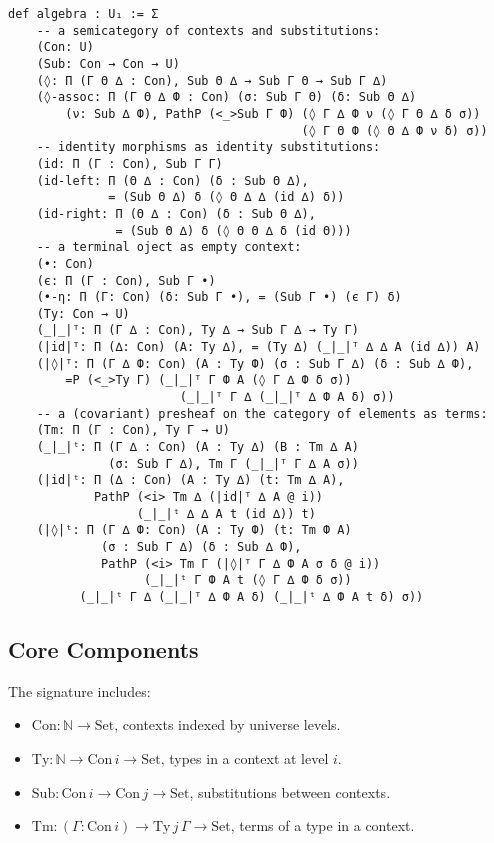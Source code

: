 \documentclass{article}
\begin{document}
\begin{lstlisting}[mathescape=true]
def algebra : U₁ := Σ
    -- a semicategory of contexts and substitutions:
    (Con: U)
    (Sub: Con → Con → U)
    (◊: Π (Г Θ ∆ : Con), Sub Θ ∆ → Sub Г Θ → Sub Г ∆)
    (◊-assoc: Π (Г Θ ∆ Ф : Con) (σ: Sub Г Θ) (δ: Sub Θ ∆)
        (ν: Sub ∆ Ф), PathP (<_>Sub Г Ф) (◊ Г ∆ Ф ν (◊ Г Θ ∆ δ σ))
                                         (◊ Г Θ Ф (◊ Θ ∆ Ф ν δ) σ))
    -- identity morphisms as identity substitutions:
    (id: Π (Г : Con), Sub Г Г)
    (id-left: Π (Θ ∆ : Con) (δ : Sub Θ ∆),
              = (Sub Θ ∆) δ (◊ Θ ∆ ∆ (id ∆) δ))
    (id-right: Π (Θ ∆ : Con) (δ : Sub Θ ∆),
               = (Sub Θ ∆) δ (◊ Θ Θ ∆ δ (id Θ)))
    -- a terminal oject as empty context:
    (•: Con)
    (є: Π (Г : Con), Sub Г •)
    (•-η: Π (Г: Con) (δ: Sub Г •), = (Sub Г •) (є Г) δ)
    (Ty: Con → U)
    (_|_|ᵀ: Π (Г ∆ : Con), Ty ∆ → Sub Г ∆ → Ty Г)
    (|id|ᵀ: Π (∆: Con) (A: Ty ∆), = (Ty ∆) (_|_|ᵀ ∆ ∆ A (id ∆)) A)
    (|◊|ᵀ: Π (Г ∆ Ф: Con) (A : Ty Ф) (σ : Sub Г ∆) (δ : Sub ∆ Ф),
        =P (<_>Ty Г) (_|_|ᵀ Г Ф A (◊ Г ∆ Ф δ σ))
                        (_|_|ᵀ Г ∆ (_|_|ᵀ ∆ Ф A δ) σ))
    -- a (covariant) presheaf on the category of elements as terms:
    (Tm: Π (Г : Con), Ty Г → U)
    (_|_|ᵗ: Π (Г ∆ : Con) (A : Ty ∆) (B : Tm ∆ A)
              (σ: Sub Г ∆), Tm Г (_|_|ᵀ Г ∆ A σ))
    (|id|ᵗ: Π (∆ : Con) (A : Ty ∆) (t: Tm ∆ A),
            PathP (<i> Tm ∆ (|id|ᵀ ∆ A @ i))
                  (_|_|ᵗ ∆ ∆ A t (id ∆)) t)
    (|◊|ᵗ: Π (Г ∆ Ф: Con) (A : Ty Ф) (t: Tm Ф A)
             (σ : Sub Г ∆) (δ : Sub ∆ Ф),
             PathP (<i> Tm Г (|◊|ᵀ Г ∆ Ф A σ δ @ i))
                   (_|_|ᵗ Г Ф A t (◊ Г ∆ Ф δ σ))
          (_|_|ᵗ Г ∆ (_|_|ᵀ ∆ Ф A δ) (_|_|ᵗ ∆ Ф A t δ) σ))
\end{lstlisting}

\newpage
\subsection{Core Components}
The signature includes:
\begin{itemize}
    \item \(\mathrm{Con} : \mathbb{N} \to \mathrm{Set}\), contexts indexed by universe levels.
    \item \(\mathrm{Ty} : \mathbb{N} \to \mathrm{Con}\, i \to \mathrm{Set}\), types in a context at level \(i\).
    \item \(\mathrm{Sub} : \mathrm{Con}\, i \to \mathrm{Con}\, j \to \mathrm{Set}\), substitutions between contexts.
    \item \(\mathrm{Tm} : (\Gamma : \mathrm{Con}\, i) \to \mathrm{Ty}\, j\, \Gamma \to \mathrm{Set}\), terms of a type in a context.
\end{itemize}
\end{document}
